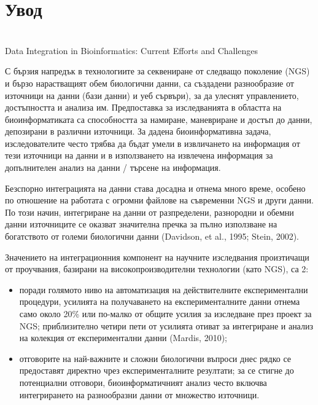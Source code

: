 \documentclass[12pt, a4paper, oneside]{book}
\begin{document}
\chapter*{Увод}

\\Data Integration in Bioinformatics: Current Efforts and Challenges

С бързия напредък в технологиите за секвениране от следващо поколение (NGS) и бързо нарастващият обем биологични данни, са създадени разнообразие от източници на данни (бази данни) и уеб сървъри), за да улеснят управлението, достъпността и анализа им. Предпоставка за изследванията в областта на биоинформатиката са способността за намиране, маневриране и достъп до данни, депозирани в различни източници. За дадена биоинформативна задача, изследователите често трябва да бъдат умели в извличането на информация от тези източници на данни и в използването на извлечена информация за допълнителен анализ на данни / търсене на информация. \cite{BIOINFORMATICS-TRENDS-AND-METHODOLOGIES}

Безспорно интеграцията на данни става досадна и отнема много време, особено по отношение на работата с огромни файлове на съвременни NGS и други данни. По този начин, интегриране на данни от разпределени, разнородни и обемни данни източниците се оказват значителна пречка за пълно използване на богатството от големи биологични данни (Davidson, et al., 1995; Stein, 2002).\cite{BIOINFORMATICS-TRENDS-AND-METHODOLOGIES}

Значението на интеграционния компонент на научните изследвания произтичащи от проучвания, базирани на високопроизводителни технологии (като NGS), са 2:
\begin{itemize}
    \item поради голямото ниво на автоматизация на действителните експериментални процедури, усилията на
получаването на експерименталните данни отнема само около 20\% или по-малко от общите усилия за изследване през проект за NGS; приблизително четири пети от усилията отиват за интегриране и анализ на колекция от експериментални данни (Mardis, 2010);
    \item отговорите на най-важните и сложни биологични въпроси днес рядко се предоставят директно чрез експерименталните резултати; за се стигне до потенциални отговори, биоинформатичният анализ често включва интегрирането на разнообразни данни от множество източници.
\end{itemize}
\cite{BIOINFORMATICS-TRENDS-AND-METHODOLOGIES}
\end{document}
